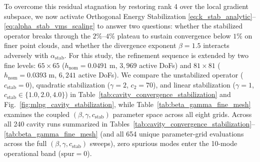 \documentclass[VANCOUVER]{USG}
\begin{document}
To overcome this residual stagnation by restoring rank 4 over the local gradient subspace, we now activate Orthogonal Energy Stabilization \eqref{eq:k_stab_analytic}--\eqref{eq:alpha_stab_vms_scaling} to answer two questions: whether the stabilized operator breaks through the $2\%\text{--}4\%$ plateau to sustain convergence below $1\%$ on finer point clouds, and whether the divergence exponent $\beta = 1.5$ interacts adversely with $\alpha_{\mathrm{stab}}$. For this study, the refinement sequence is extended by two fine levels: $65 \times 65$ ($h_{\mathrm{nom}} = 0.0491\text{ m}$, $3,969$ active DoFs) and $81 \times 81$ ($h_{\mathrm{nom}} = 0.0393\text{ m}$, $6,241$ active DoFs). We compare the unstabilized operator ($c_{\mathrm{stab}} = 0$), quadratic stabilization ($\gamma = 2$, $c_2 = 70$), and linear stabilization ($\gamma = 1$, $c_{\mathrm{stab}} \in \{1.0, 2.0, 4.0\}$) in Table~\ref{tab:cavity_convergence_stabilization} and Fig.~\ref{fig:mlpg_cavity_stabilization}, while Table~\ref{tab:beta_gamma_fine_mesh} examines the coupled $(\beta, \gamma, c_{\mathrm{stab}})$ parameter space across all eight grids. Across all 240 cavity runs summarized in Tables~\ref{tab:cavity_convergence_stabilization}--\ref{tab:beta_gamma_fine_mesh} (and all 654 unique parameter-grid evaluations across the full $(\beta, \gamma, c_{\mathrm{stab}})$ sweeps), zero spurious modes enter the 10-mode operational band ($\mathrm{spur} = 0$).
\end{document}
